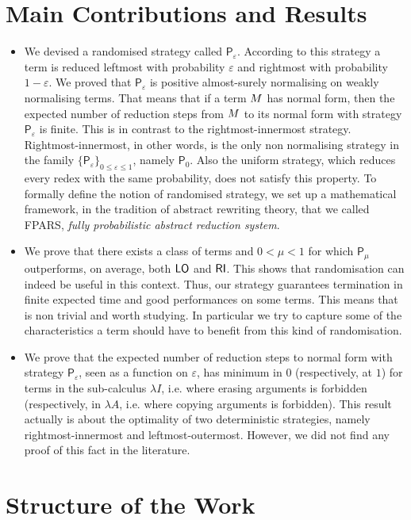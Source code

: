 \section{Main Contributions and Results}
\begin{itemize}
\item We devised a randomised strategy called $\mathsf{P}_\varepsilon$. According to this strategy a term is reduced leftmost with probability $\varepsilon$ and rightmost with probability $1-\varepsilon$. We proved that $\mathsf{P}_\varepsilon$ is positive almost-surely normalising on
weakly normalising terms. That means that if a term $M$ has normal form, then the expected number of reduction steps from
$M$ to its normal form with strategy $\mathsf{P}_\varepsilon$
is finite. This is in contrast to the rightmost-innermost strategy. Rightmost-innermost, in other
words, is the only non normalising strategy in the family
$\{\mathsf{P}_\varepsilon\}_{0\leq\varepsilon\leq 1}$, namely $\mathsf{P}_0$. Also the uniform strategy, which reduces every redex with the same probability, does not satisfy this property. To formally define the notion of randomised strategy, we set up a mathematical framework, in the tradition of abstract rewriting theory, that we called FPARS, \emph{fully probabilistic abstract reduction system}.
\item We prove that there exists a class of terms and
$0<\mu<1$ for which $\mathsf{P}_\mu$ outperforms, on average, both
$\textsf{LO}$ and $\textsf{RI}$. This shows that randomisation can
indeed be useful in this context. Thus, our strategy guarantees termination in finite expected time and good performances on some terms. This means that is non trivial and worth studying. In particular we try to capture some of the characteristics a term should have to benefit from this kind of randomisation.
\item We prove that the expected number of reduction steps to
normal form with strategy $\mathsf{P}_\varepsilon$, seen as a function
on $\varepsilon$, has minimum in $0$ (respectively, at $1$) for terms
in the sub-calculus $\lambda I$, i.e. where erasing arguments is forbidden (respectively, in $\lambda A$, i.e. where copying arguments is forbidden). This result actually is about the optimality of two deterministic strategies, namely rightmost-innermost and leftmost-outermost. However, we did not find any proof of this fact in the literature.
\end{itemize}
\section{Structure of the Work}
